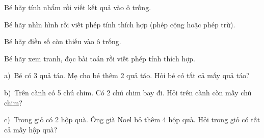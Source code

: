 \documentclass[../main.tex]{subfiles}
\begin{document}
\begin{bt}
    Bé hãy tính nhẩm rồi viết kết quả vào ô trống.
    \TTbatdauhinh
    {\centering
    \hfill{}\par\vspace{6pt}
    \hfill{}\par\vspace{6pt}
    \hfill{}\par\vspace{6pt}
    \hfill{}\par}
\end{bt}

\begin{bt}
    Bé hãy nhìn hình rồi viết phép tính thích hợp (phép cộng hoặc phép trừ).
    \TTbatdauhinh
    {\centering
    \PHcach
    \PHcach
    \PHcach
    \par}
\end{bt}

\begin{bt}
    Bé hãy điền số còn thiếu vào ô trống.
    \TTbatdauhinh
    {\centering
    \hfill{}\par\vspace{6pt}
    \hfill{}\par}
\end{bt}

\newpage
\begin{bt}
    Bé hãy xem tranh, đọc bài toán rồi viết phép tính thích hợp.
    \TTbatdauhinh
    {\raggedright\sffamily
    a)\ Bé có 3 quả táo. Mẹ cho bé thêm 2 quả táo. Hỏi bé có tất cả mấy quả táo?\par\vspace{3pt}}
    {\centering{}\par\vspace{8pt}}
    {\raggedright\sffamily
    b)\ Trên cành có 5 chú chim. Có 2 chú chim bay đi. Hỏi trên cành còn mấy chú chim?\par\vspace{3pt}}
    {\centering{}\par\vspace{8pt}}
    {\raggedright\sffamily
    c)\ Trong giỏ có 2 hộp quà. Ông già Noel bỏ thêm 4 hộp quà. Hỏi trong giỏ có tất cả mấy hộp quà?\par\vspace{3pt}}
    {\centering{}\par\vspace{8pt}}
    {\raggedright\sffamily
    \par\vspace{3pt}}
    {\centering{}\par}
\end{bt}
\end{document}
